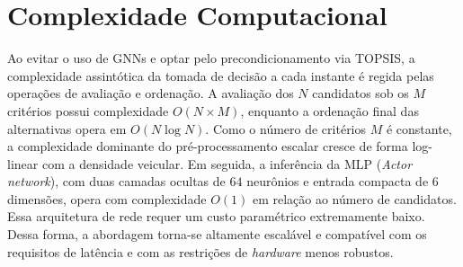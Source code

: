 

\section{Complexidade Computacional}
\label{sec:complexidade}
Ao evitar o uso de \glspl{GNN} e optar pelo precondicionamento via \gls{TOPSIS}, a complexidade assintótica da tomada de decisão a cada instante é regida pelas operações de avaliação e ordenação. A avaliação dos $N$ candidatos sob os $M$ critérios possui complexidade $O(N \times M)$, enquanto a ordenação final das alternativas opera em $O(N \log N)$. Como o número de critérios $M$ é constante, a complexidade dominante do pré-processamento escalar cresce de forma log-linear com a densidade veicular. Em seguida, a inferência da \gls{MLP} (\textit{Actor network}), com duas camadas ocultas de $64$ neurônios e entrada compacta de 6 dimensões, opera com complexidade $O(1)$ em relação ao número de candidatos. Essa arquitetura de rede requer um custo paramétrico extremamente baixo. Dessa forma, a abordagem torna-se altamente escalável e compatível com os requisitos de latência e com as restrições de \textit{hardware} menos robustos.

